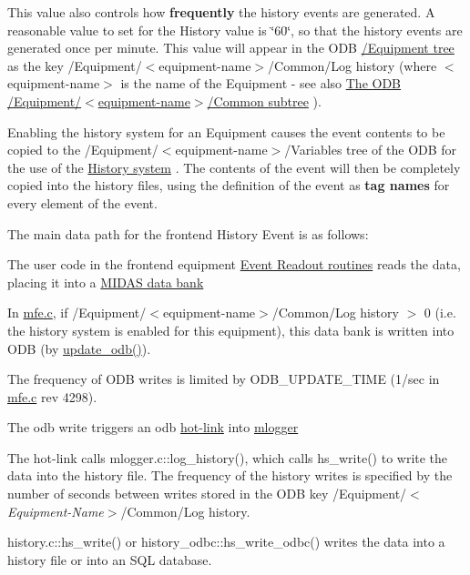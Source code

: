 This value also controls how {\bfseries frequently} the history events are generated. A reasonable value to set for the History value is \char`\"{}60\char`\"{}, so that the history events are generated once per minute. This value will appear in the ODB \hyperlink{FE_ODB_equipment_tree}{/Equipment tree} as the key /Equipment/$<$equipment-\/name$>$/Common/Log history (where $<$equipment-\/name$>$ is the name of the Equipment -\/ see also \hyperlink{FE_ODB_equipment_tree_FE_ODB_equipment_common}{The ODB /Equipment/$<$equipment-\/name$>$/Common subtree} ).

\par
 Enabling the history system for an Equipment causes the event contents to be copied to the /Equipment/$<$equipment-\/name$>$/Variables tree of the ODB for the use of the \hyperlink{F_MainElements_F_History_System_overview}{History system} . The contents of the event will then be completely copied into the history files, using the definition of the event as {\bfseries  tag names } for every element of the event. \par


The main data path for the frontend History Event is as follows:
\begin{DoxyEnumerate}
\item The user code in the frontend equipment \hyperlink{FE_eq_event_routines_FE_readout_routine}{Event Readout routines} reads the data, placing it into a \hyperlink{FE_bank_construction_FE_MIDAS_event_construction}{MIDAS data bank}
\item In \hyperlink{mfe_8c}{mfe.c}, if /Equipment/$<$equipment-\/name$>$/Common/Log history $>$ 0 (i.e. the history system is enabled for this equipment), this data bank is written into ODB (by \hyperlink{mfe_8c_acca4a95b509b37c83c2e76cb88de232a}{update\_\-odb()}).
\end{DoxyEnumerate}

\label{F_History_logging_idx_hotlink_history-event}
\hypertarget{F_History_logging_idx_hotlink_history-event}{}
 \label{F_History_logging_F_history_hot_link}
\hypertarget{F_History_logging_F_history_hot_link}{}
 The frequency of ODB writes is limited by ODB\_\-UPDATE\_\-TIME (1/sec in \hyperlink{mfe_8c}{mfe.c} rev 4298).
\begin{DoxyEnumerate}
\item The odb write triggers an odb \hyperlink{RC_Hot_Link}{hot-\/link} into \hyperlink{F_Logging_F_mlogger_utility}{mlogger}
\item The hot-\/link calls mlogger.c::log\_\-history(), which calls hs\_\-write() to write the data into the history file. The frequency of the history writes is specified by the number of seconds between writes stored in the ODB key /Equipment/$<${\itshape Equipment-\/Name\/}$>$/Common/Log history.
\item history.c::hs\_\-write() or history\_\-odbc::hs\_\-write\_\-odbc() writes the data into a history file or into an SQL database.
\end{DoxyEnumerate}


